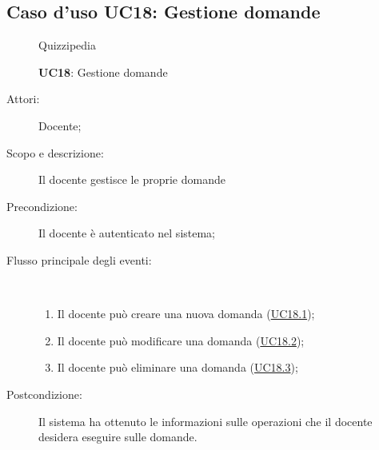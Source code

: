 \subsection{Caso d'uso UC18: Gestione domande}
	\begin{figure}[H]
		\centering
		\begin{resizedtikzpicture}{\textwidth}
		\begin{umlsystem}[x=0, fill=lightgray!20]{Quizzipedia}
		\end{umlsystem}
		\end{resizedtikzpicture}
		\caption{\textbf{UC18}: Gestione domande}
		\label{UC18}
	\end{figure}
\begin{description}
\item[Attori:] Docente;
\item[Scopo e descrizione:] Il docente gestisce le proprie domande
      \item[Precondizione:] Il docente è autenticato nel sistema;

        \item[Flusso principale degli eventi:] \ 
 \begin{enumerate}
          \item Il docente può creare una nuova domanda (\hyperlink{UC18.1}{UC18.1});
          \item Il docente può modificare una domanda (\hyperlink{UC18.2}{UC18.2});
          \item Il docente può eliminare una domanda (\hyperlink{UC18.3}{UC18.3});

      \end{enumerate}
    \item[Postcondizione:] Il sistema ha ottenuto le informazioni sulle operazioni che il docente desidera eseguire sulle domande.
  \end{description}
\hypertarget{UC18.1}{}
